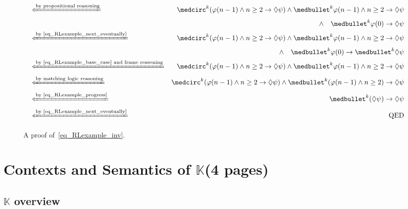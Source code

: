 \documentclass[acmsmall,review,anonymous]{acmart}
\newcommand{\K}{$\mathbb{K}$\xspace}
\newcommand{\imp}{\to}
\newcommand{\xif}[1]{\xLeftarrow{\text{#1}}}
\newcommand{\wnext}{{\medcirc}}
\newcommand{\snext}{{\medbullet}}
\newcommand{\eventually}{{\lozenge}}
\newcommand{\QED}{\text{QED}}
\begin{document}
\begin{figure}
{\begin{align*}
\\
&\xif{by propositional reasoning}&
\wnext^k  (\varphi(n-1) \wedge n \ge 2 \imp \eventually \psi)
\wedge \snext^k \varphi(n-1) \wedge n \ge 2 \imp \eventually \psi
\\&&
\wedge\quad
\snext^k \varphi(0) \imp \eventually \psi
\\
&\xif{by~\eqref{eq_RLexample_next_eventually}}&
\wnext^k  (\varphi(n-1) \wedge n \ge 2 \imp \eventually \psi)
\wedge \snext^k \varphi(n-1) \wedge n \ge 2 \imp \eventually \psi
\\&&
\wedge\quad
\snext^k \varphi(0) \imp \snext^k \eventually \psi
\\
&\xif{by~\eqref{eq_RLexample_base_case} and frame reasoning}&
\wnext^k  (\varphi(n-1) \wedge n \ge 2 \imp \eventually \psi)
\wedge \snext^k \varphi(n-1) \wedge n \ge 2 \imp \eventually \psi
\\
&\xif{by matching logic reasoning}&
\wnext^k  (\varphi(n-1) \wedge n \ge 2 \imp \eventually \psi)
\wedge \snext^k (\varphi(n-1) \wedge n \ge 2) \imp \eventually \psi
\\
&\xif{by~\eqref{eq_RLexample_progress}}&
\snext^k  (\eventually \psi) \imp \eventually \psi
\\
&\xif{by~\eqref{eq_RLexample_next_eventually}}&
\QED
\end{align*}
}
\caption{A proof of~\eqref{eq_RLexample_inv}.}
\label{fig_RLexample_proof}
\end{figure}





\section{Contexts and Semantics of \K (4 pages)}

\subsection{\K overview}
\end{document}
